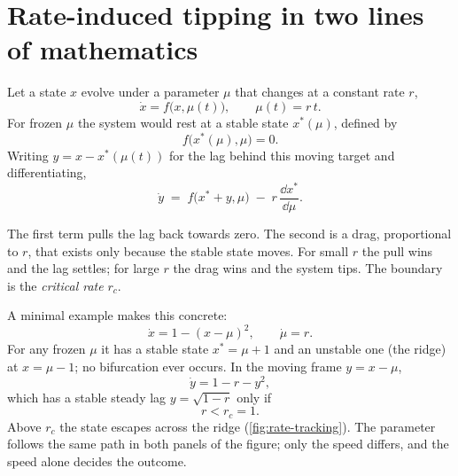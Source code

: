 \section{Rate-induced tipping in two lines of mathematics}\label{sec:rtip-maths}

Let a state $x$ evolve under a parameter $\mu$ that changes at a constant rate $r$,
\begin{equation}
  \dot{x} = f\bigl(x,\mu(t)\bigr), \qquad \mu(t) = r\,t .
  \label{eq:nonautonomous}
\end{equation}
For frozen $\mu$ the system would rest at a stable state $x^{*}(\mu)$, defined by
\begin{equation}
  f\bigl(x^{*}(\mu),\mu\bigr) = 0 .
  \label{eq:frozen-state}
\end{equation}
Writing $y = x - x^{*}(\mu(t))$ for the lag behind this moving target and differentiating,
\begin{equation}
  \dot{y} \;=\; f\bigl(x^{*}+y,\mu\bigr) \;-\; r\,\frac{\dd x^{*}}{\dd\mu} .
  \label{eq:moving-frame}
\end{equation}

\begin{whybox}
The first term pulls the lag back towards zero. The second is a drag, proportional to $r$, that exists
only because the stable state moves. For small $r$ the pull wins and the lag settles; for large $r$ the
drag wins and the system tips. The boundary is the \emph{critical rate} $r_{c}$.
\end{whybox}

A minimal example makes this concrete:
\begin{equation}
  \dot{x} = 1 - (x-\mu)^{2}, \qquad \dot{\mu} = r .
  \label{eq:toy-model}
\end{equation}
For any frozen $\mu$ it has a stable state $x^{*}=\mu+1$ and an unstable one (the ridge) at
$x=\mu-1$; no bifurcation ever occurs. In the moving frame $y=x-\mu$,
\begin{equation}
  \dot{y} = 1 - r - y^{2} ,
  \label{eq:toy-moving}
\end{equation}
which has a stable steady lag $y=\sqrt{1-r}$ only if
\begin{equation}
  r < r_{c} = 1 .
  \label{eq:toy-rc}
\end{equation}
Above $r_{c}$ the state escapes across the ridge (\cref{fig:rate-tracking}). The parameter follows the
same path in both panels of the figure; only the speed differs, and the speed alone decides the outcome.

